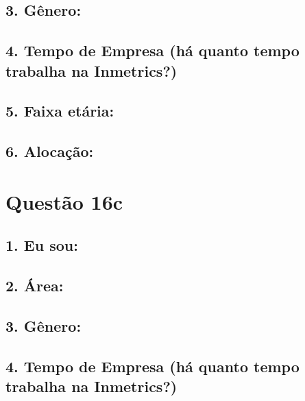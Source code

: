 \documentclass[]{book}
\begin{document}
\hypertarget{genero-30}{%
\subsection{3. Gênero:}\label{genero-30}}

\hypertarget{tempo-de-empresa-ha-quanto-tempo-trabalha-na-inmetrics-30}{%
\subsection{4. Tempo de Empresa (há quanto tempo trabalha na Inmetrics?)}\label{tempo-de-empresa-ha-quanto-tempo-trabalha-na-inmetrics-30}}

\hypertarget{faixa-etaria-30}{%
\subsection{5. Faixa etária:}\label{faixa-etaria-30}}

\hypertarget{alocacao-30}{%
\subsection{6. Alocação:}\label{alocacao-30}}

\hypertarget{questao-16c}{%
\section{Questão 16c}\label{questao-16c}}

\hypertarget{eu-sou-31}{%
\subsection{1. Eu sou:}\label{eu-sou-31}}

\hypertarget{area-31}{%
\subsection{2. Área:}\label{area-31}}

\hypertarget{genero-31}{%
\subsection{3. Gênero:}\label{genero-31}}

\hypertarget{tempo-de-empresa-ha-quanto-tempo-trabalha-na-inmetrics-31}{%
\subsection{4. Tempo de Empresa (há quanto tempo trabalha na Inmetrics?)}\label{tempo-de-empresa-ha-quanto-tempo-trabalha-na-inmetrics-31}}
\end{document}
